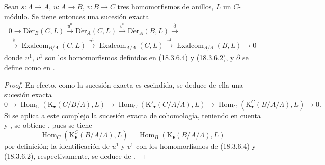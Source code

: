\begin{proposition}[20.6.25]
\label{0.20.6.25-fr}
Sean $s:\Lambda\to A$, $u:A\to B$, $v:B\to C$ tres homomorfismos
de anillos, $L$ un $C$-módulo. Se tiene entonces una sucesión exacta
\begin{equation}
\tag{20.6.25.1}
\label{0.20.6.25.1-fr}
\begin{split}
  0\to\operatorname{D\acute{e}r}_B(C,L)\xrightarrow{u^0}
  \operatorname{D\acute{e}r}_A(C,L)\xrightarrow{v^0}
  \operatorname{D\acute{e}r}_A(B,L)\xrightarrow{\partial} \\
  \xrightarrow{\partial}\operatorname{Exalcom}_{B/\Lambda}(C,L)\xrightarrow{u^1}
  \operatorname{Exalcom}_{A/\Lambda}(C,L)\xrightarrow{v^1}
  \operatorname{Exalcom}_{A/\Lambda}(B,L)\to0
\end{split}
\end{equation}
donde $u^1$, $v^1$ son los homomorfismos definidos en \textup{(18.3.6.4)} y
\textup{(18.3.6.2)}, y $\partial$ se define como en \textup{}.
\end{proposition}

\begin{proof}
En efecto, como la sucesión exacta  es escindida, se
deduce de ella una sucesión exacta
\[
  0\to\operatorname{Hom}_C(\mathrm{K}_\bullet(C/B/\Lambda),L)\to
  \operatorname{Hom}_C(\mathrm{K}'_\bullet(C/A/\Lambda),L)\to
  \operatorname{Hom}_C(\mathrm{K}^C_\bullet(B/A/\Lambda),L)\to0.
\]
Si se aplica a este complejo la sucesión exacta de cohomología, teniendo en cuenta
 y , se obtiene
, pues se tiene
\[
  \operatorname{Hom}_C(\mathrm{K}^C_\bullet(B/A/\Lambda),L)
  =\operatorname{Hom}_B(\mathrm{K}_\bullet(B/A/\Lambda),L)
\]
por definición; la identificación de $u^1$ y $v^1$ con los homomorfismos
de (18.3.6.4) y (18.3.6.2), respectivamente, se deduce de
.
\end{proof}

